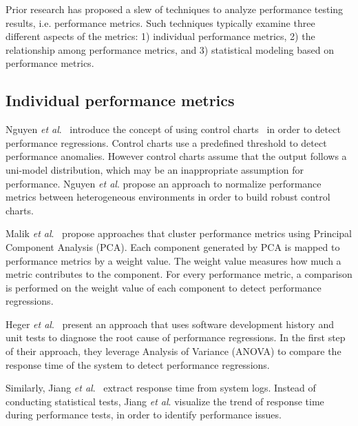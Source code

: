 Prior research has proposed a slew of techniques to analyze performance testing results, i.e. performance metrics. Such techniques typically examine three different aspects of the metrics: 1) individual performance metrics, 2) the relationship among performance metrics, and 3) statistical modeling based on performance metrics.


\subsection{Individual performance metrics}
\label{sec:relatedindividual}
Nguyen \textit{et al$.$}~\cite{Nguyen:2012:ADP:2188286.2188344} introduce the concept of using control charts~\cite{shewhart1931economic} in order to detect performance regressions. Control charts use a predefined threshold to detect performance anomalies. However control charts assume that the output follows a uni-model distribution, which may be an inappropriate assumption for performance. Nguyen \textit{et al$.$} propose an approach to normalize performance metrics between heterogeneous environments in order to build robust control charts. %

Malik \emph{et al$.$}~\cite{Malik:2010:ACL:1955601.1955936, haroon} propose approaches that cluster performance metrics using Principal Component Analysis (PCA). Each component generated by PCA is mapped to performance metrics by a weight value. The weight value measures how much a metric contributes to the component. For every performance metric, a comparison is performed on the weight value of each component to detect performance regressions.

Heger \emph{et al$.$}~\cite{DBLP:conf/wosp/HegerHF13} present an approach that uses software development history and unit tests to diagnose the root cause of performance regressions. In the first step of their approach, they leverage Analysis of Variance (ANOVA) to compare the response time of the system to detect performance regressions. 

Similarly, Jiang \emph{et al$.$}~\cite{jackicsm2009} extract response time from system logs. Instead of conducting statistical tests, Jiang \emph{et al$.$} visualize the trend of response time during performance tests, in order to identify performance issues.


%



